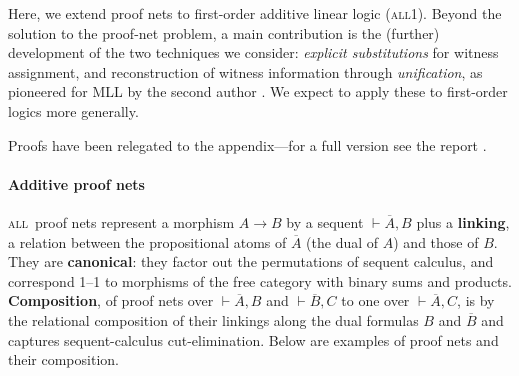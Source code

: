 \documentclass[a4paper,UKenglish]{lipics-v2019}
\newcommand\defn[1]{\textbf{#1}}
\newcommand\all{\textsc{all}}
\newcommand\+{+}
\renewcommand\*{\times}
\newcommand\dual[1]{\overline{#1}}
\newcommand\seq[2]{{\vdash}#1,#2}
\begin{document}
Here, we extend proof nets to first-order additive linear logic (\all{\textnormal 1}). Beyond the solution to the proof-net problem, a main contribution is the (further) development of the two techniques we consider: \emph{explicit substitutions} for witness assignment, and reconstruction of witness information through \emph{unification}, as pioneered for MLL by the second author \cite{Hughes-2018}. We expect to apply these to first-order logics more generally.

Proofs have been relegated to the appendix---for a full version see the report \cite{Heijltjes-Hughes-Strassburger-2018}.

\paragraph*{Additive proof nets}
%
\all\ proof nets \cite[Section 4.10]{Hughes-vanGlabbeek-2005} represent a morphism $A\to B$ by a sequent $\seq{\dual A}B$ plus a \defn{linking}, a relation between the propositional atoms of $\dual A$ (the dual of $A$) and those of $B$. They are \defn{canonical}: they factor out the permutations of sequent calculus, and correspond 1--1 to morphisms of the free category with binary sums and products. \defn{Composition}, of proof nets over $\seq{\dual A}B$ and $\seq{\dual B}C$ to one over $\seq{\dual A}C$, is by the relational composition of their linkings along the dual formulas $B$ and $\dual B$ and captures sequent-calculus cut-elimination. Below are examples of proof nets and their composition.
%
\end{document}
